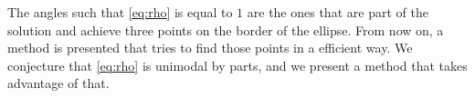 The angles such that \autoref{eq:rho} is equal to $1$ are the ones that are part of the solution and achieve three points on the border of the ellipse. From now on, a method is presented that tries to find those points in a efficient way. We conjecture that \autoref{eq:rho} is unimodal by parts, and we present a method that takes advantage of that.